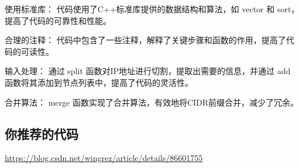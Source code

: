 使用标准库： 代码使用了C++标准库提供的数据结构和算法，如 vector 和 sort，提高了代码的可靠性和性能。

合理的注释： 代码中包含了一些注释，解释了关键步骤和函数的作用，提高了代码的可读性。

输入处理： 通过 split 函数对IP地址进行切割，提取出需要的信息，并通过 add 函数将其添加到节点列表中，提高了代码的灵活性。

合并算法： merge 函数实现了合并算法，有效地将CIDR前缀合并，减少了冗余。

\subsection{你推荐的代码}

\href{201812-3 CIDR合并}{https://blog.csdn.net/wingrez/article/details/86601755}

